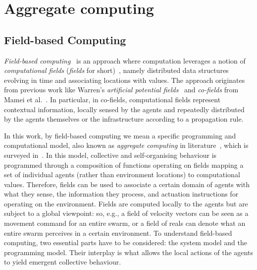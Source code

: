 \section{Aggregate computing}
\subsection{Field-based Computing}
\label{s:background-fieldcomp}

\emph{Field-based computing}~\cite{DBLP:journals/jlap/ViroliBDACP19}
 is an approach
 where computation leverages
 a notion of \emph{computational fields} (\emph{fields} for short)~\cite{DBLP:conf/icra/Warren89,DBLP:journals/pervasive/MameiZL04,DBLP:journals/jlap/ViroliBDACP19}, namely
 distributed data structures evolving in time and associating locations with values.
%
The approach originates from previous work
 like
 Warren's \emph{artificial potential fields}~\cite{DBLP:conf/icra/Warren89}
 and
 \emph{co-fields} from Mamei et al.~\cite{DBLP:journals/pervasive/MameiZL04}.
%
In particular, in co-fields, computational fields represent contextual information, locally sensed by the agents and repeatedly distributed by the agents themselves or the infrastructure according to a propagation rule.

In this work, by field-based computing we mean a specific programming and computational model,
 also known as \emph{aggregate computing} in literature~\cite{DBLP:journals/computer/BealPV15},
 which is surveyed in~\cite{DBLP:journals/jlap/ViroliBDACP19}.
In this model,  collective and self-organising behaviour
 is programmed through a composition
 of functions operating on fields
 mapping a set of individual agents (rather than environment locations)
 to computational values.
%
Therefore, fields can be used to associate a certain domain of agents
 with what they sense, the information they process, and actuation instructions for operating on the environment.
%
Fields are computed locally to the agents
 but are subject to a global viewpoint:
 so, e.g., a field of velocity vectors can be seen as a movement command for an entire swarm, or
 a field of reals can denote what an entire swarm perceives in a certain environment.
%
To understand field-based computing,
 two essential parts have to be considered: the system model
 and the programming model.
 Their interplay is what allows the local actions of the agents
 to yield emergent collective behaviour.

